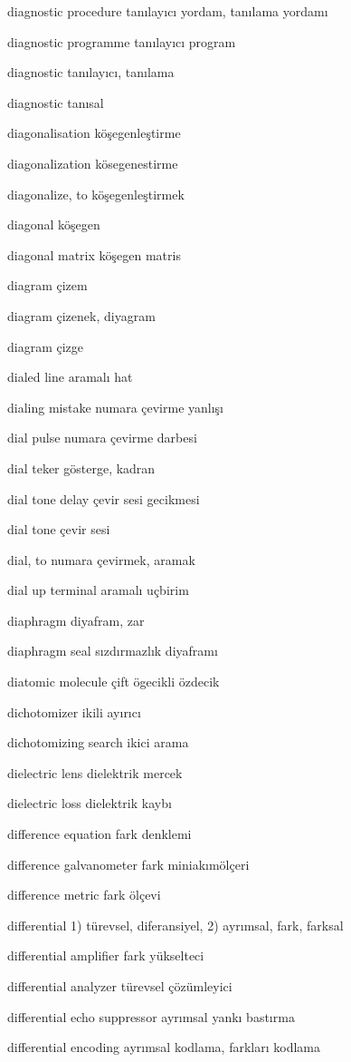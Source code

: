 \documentclass[12pt,fleqn]{article}\usepackage{../../common}
\begin{document}
diagnostic procedure tanılayıcı yordam, tanılama yordamı

diagnostic programme tanılayıcı program

diagnostic tanılayıcı, tanılama

diagnostic tanısal

diagonalisation köşegenleştirme

diagonalization kösegenestirme

diagonalize, to köşegenleştirmek

diagonal köşegen

diagonal matrix köşegen matris

diagram çizem

diagram çizenek, diyagram

diagram çizge

dialed line aramalı hat

dialing mistake numara çevirme yanlışı

dial pulse numara çevirme darbesi

dial teker gösterge, kadran

dial tone delay çevir sesi gecikmesi

dial tone çevir sesi

dial, to numara çevirmek, aramak

dial up terminal aramalı uçbirim

diaphragm diyafram, zar

diaphragm seal sızdırmazlık diyaframı

diatomic molecule çift ögecikli özdecik

dichotomizer ikili ayırıcı

dichotomizing search ikici arama

dielectric lens dielektrik mercek

dielectric loss dielektrik kaybı

difference equation fark denklemi

difference galvanometer fark miniakımölçeri

difference metric fark ölçevi

differential 1) türevsel, diferansiyel, 2) ayrımsal, fark, farksal

differential amplifier fark yükselteci

differential analyzer türevsel çözümleyici

differential echo suppressor ayrımsal yankı bastırma

differential encoding ayrımsal kodlama, farkları kodlama
\end{document}
